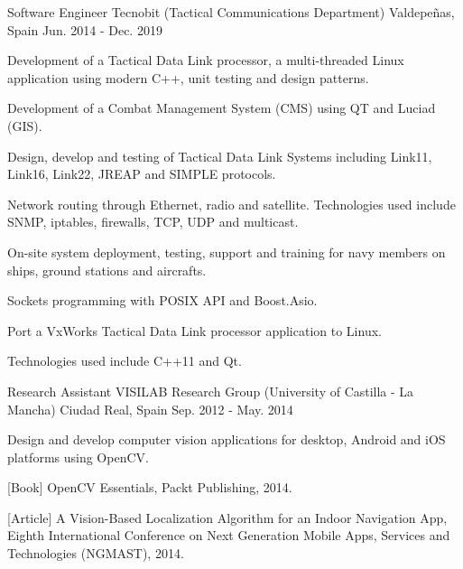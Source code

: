 \begin{cventries}
  \cventry
    {Software Engineer} %
    {Tecnobit (Tactical Communications Department)} %
    {Valdepeñas, Spain} %
    {Jun. 2014 - Dec. 2019} %
    {
      \begin{cvitems} %
        \item {Development of a Tactical Data Link processor, a multi-threaded Linux application using modern C++, unit testing and design patterns.}
        \item {Development of a Combat Management System (CMS) using QT and Luciad (GIS).}
        \item {Design, develop and testing of Tactical Data Link Systems including Link11, Link16, Link22, JREAP and SIMPLE protocols.}
        \item {Network routing through Ethernet, radio and satellite. Technologies used include SNMP, iptables, firewalls, TCP, UDP and multicast.}
        \item {On-site system deployment, testing, support and training for navy members on ships, ground stations and aircrafts.}
        \item {Sockets programming with POSIX API and Boost.Asio.}
        \item {Port a VxWorks Tactical Data Link processor application to Linux.}
        \item {Technologies used include C++11 and Qt.}
      \end{cvitems}
    }


  \cventry
    {Research Assistant} %
    {VISILAB Research Group (University of Castilla - La Mancha)} %
    {Ciudad Real, Spain} %
    {Sep. 2012 - May. 2014} %
    {
      \begin{cvitems} %
        \item {Design and develop computer vision applications for desktop, Android and iOS platforms using OpenCV.}
        \item {[Book] OpenCV Essentials, Packt Publishing, 2014.}
        \item {[Article] A Vision-Based Localization Algorithm for an Indoor Navigation App, Eighth International Conference on Next Generation Mobile Apps, Services and Technologies (NGMAST), 2014.}
      \end{cvitems}
    }




\end{cventries}
